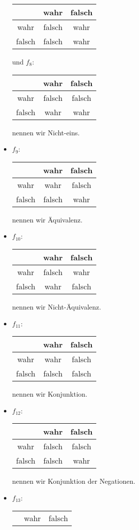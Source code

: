 \begin{solution}
\begin{itemize}
\begin{tabular}{|c||c|c|}
\hline
& wahr & falsch \\
\hline
\hline
wahr & falsch & wahr \\
\hline
falsch & falsch & wahr\\
\hline
\end{tabular} und
$f_8$:\quad\begin{tabular}{|c||c|c|}
\hline
& wahr & falsch \\
\hline
\hline
wahr & falsch & falsch \\
\hline
falsch & wahr & wahr\\
\hline
\end{tabular} nennen wir Nicht-eins.
 \item
 $f_9$:\quad\begin{tabular}{|c||c|c|}
 \hline
 & wahr & falsch \\
 \hline
 \hline
 wahr & wahr & falsch \\
 \hline
 falsch & falsch & wahr\\
 \hline
 \end{tabular} nennen wir Äquivalenz.
 \item
 $f_{10}$:\quad\begin{tabular}{|c||c|c|}
 \hline
 & wahr & falsch \\
 \hline
 \hline
 wahr & falsch & wahr \\
 \hline
 falsch & wahr & falsch\\
 \hline
 \end{tabular} nennen wir Nicht-Äquivalenz.
 \item
 $f_{11}$:\quad\begin{tabular}{|c||c|c|}
 \hline
 & wahr & falsch \\
 \hline
 \hline
 wahr & wahr & falsch \\
 \hline
 falsch & falsch & falsch\\
 \hline
 \end{tabular} nennen wir Konjunktion.
 \item
 $f_{12}$:\quad\begin{tabular}{|c||c|c|}
 \hline
 & wahr & falsch \\
 \hline
 \hline
 wahr & falsch & falsch \\
 \hline
 falsch & falsch & wahr\\
 \hline
 \end{tabular} nennen wir Konjunktion der Negationen.
 \item
 $f_{13}$:\quad\begin{tabular}{|c||c|c|}
 \hline
 & wahr & falsch \\

\end{tabular}
\end{itemize}
\end{solution}
